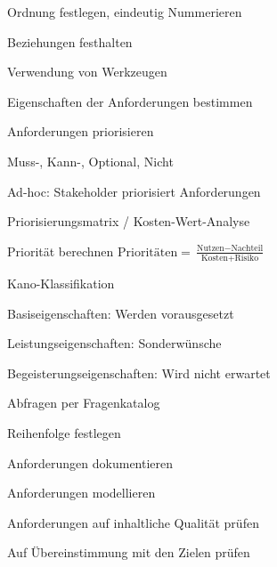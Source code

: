\documentclass[a4paper]{article}
\begin{document}
\begin{multicols}{3}
\begin{itemize*}
\begin{itemize*}
\begin{itemize*}
        \item Ordnung festlegen, eindeutig Nummerieren
        \item Beziehungen festhalten
        \item Verwendung von Werkzeugen
      \end{itemize*}
      \item Eigenschaften der Anforderungen bestimmen
      \item Anforderungen priorisieren
      \begin{itemize*}
        \item Muss-, Kann-, Optional, Nicht
        \item Ad-hoc: Stakeholder priorisiert Anforderungen
        \item Priorisierungsmatrix / Kosten-Wert-Analyse
        \item Priorität berechnen $\text{Prioritäten} = \frac{\text{Nutzen} - \text{Nachteil}}{\text{Kosten} + \text{Risiko}}$
      \end{itemize*}
      \item Kano-Klassifikation
      \begin{itemize*}
        \item Basiseigenschaften: Werden vorausgesetzt
        \item Leistungseigenschaften: Sonderwünsche
        \item Begeisterungseigenschaften: Wird nicht erwartet
        \item Abfragen per Fragenkatalog
      \end{itemize*}
      \item Reihenfolge festlegen
      \item Anforderungen dokumentieren
      \item Anforderungen modellieren
      \item Anforderungen auf inhaltliche Qualität prüfen
      \item Auf Übereinstimmung mit den Zielen prüfen
    \end{itemize*}
  \end{itemize*}



\end{multicols}
\end{document}
